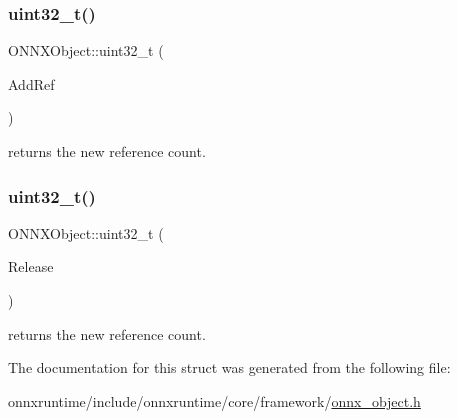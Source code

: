 \subsubsection{\texorpdfstring{uint32\+\_\+t()}{uint32\_t()}\hspace{0.1cm}{\footnotesize\ttfamily [1/2]}}
{\footnotesize\ttfamily O\+N\+N\+X\+Object\+::uint32\+\_\+t (\begin{DoxyParamCaption}\item[{\mbox{\hyperlink{error__code_8h_aeaeecdc9b792735c3e26fc0f9815c988}{O\+N\+N\+X\+R\+U\+N\+T\+I\+M\+E\+\_\+\+A\+P\+I\+\_\+\+S\+T\+A\+T\+U\+S\+C\+A\+LL}} $\ast$}]{Add\+Ref }\end{DoxyParamCaption})}



returns the new reference count. 

\mbox{\label{structONNXObject_aff32c8f5c44b75cffffdda19980ccae9}} 
\subsubsection{\texorpdfstring{uint32\+\_\+t()}{uint32\_t()}\hspace{0.1cm}{\footnotesize\ttfamily [2/2]}}
{\footnotesize\ttfamily O\+N\+N\+X\+Object\+::uint32\+\_\+t (\begin{DoxyParamCaption}\item[{\mbox{\hyperlink{error__code_8h_aeaeecdc9b792735c3e26fc0f9815c988}{O\+N\+N\+X\+R\+U\+N\+T\+I\+M\+E\+\_\+\+A\+P\+I\+\_\+\+S\+T\+A\+T\+U\+S\+C\+A\+LL}} $\ast$}]{Release }\end{DoxyParamCaption})}



returns the new reference count. 



The documentation for this struct was generated from the following file\+:\begin{DoxyCompactItemize}
\item 
onnxruntime/include/onnxruntime/core/framework/\mbox{\hyperlink{onnx__object_8h}{onnx\+\_\+object.\+h}}\end{DoxyCompactItemize}
